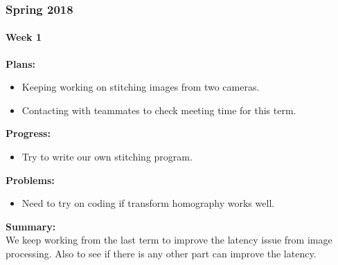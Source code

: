 \subsubsection{Spring 2018}

\paragraph{Week 1}
\begin{adjustwidth}{2.5em}{0pt}
    \vspace{-0.5cm}\textbf{Plans:}
    \vspace{-0.5cm}
    \begin{itemize}
        \item Keeping working on stitching images from two cameras.
        \item Contacting with teammates to check meeting time for this term.
    \end{itemize} 
    \vspace{-0.3cm}\textbf{Progress:}
    \vspace{-0.5cm}
    \begin{itemize}
        \item Try to write our own stitching program.
    \end{itemize} 
    \vspace{-0.3cm}\textbf{Problems:}
    \vspace{-0.5cm}
    \begin{itemize}
        \item Need to try on coding if transform homography works well.
    \end{itemize}  
    \vspace{-0.3cm}\noindent\textbf{Summary:}\\
    \noindent We keep working from the last term to improve the latency issue from image processing. Also 
    to see if there is any other part can improve the latency. \\
\end{adjustwidth}

